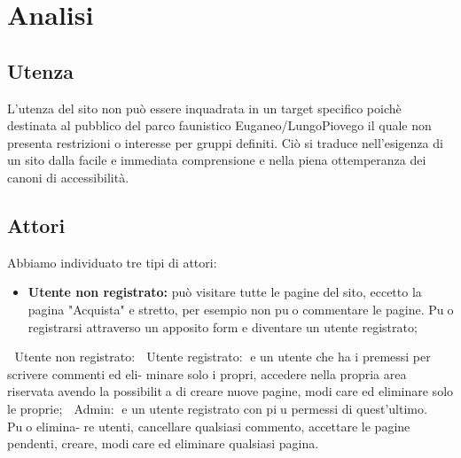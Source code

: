 \section{Analisi}

\subsection{Utenza}
L'utenza del sito non può essere inquadrata in un target specifico poichè
destinata al pubblico del parco faunistico Euganeo/LungoPiovego il quale
non presenta restrizioni o interesse per gruppi definiti.
Ciò si traduce nell'esigenza di un sito dalla facile e immediata
comprensione e nella piena ottemperanza dei canoni di accessibilità.

\subsection{Attori}
Abbiamo individuato tre tipi di attori:
\begin{itemize}
    \item \textbf{Utente non registrato: } può visitare tutte le pagine del sito, eccetto la pagina "Acquista" e stretto, per esempio non puo commentare le pagine. Puo registrarsi attraverso
    un apposito form e diventare un utente registrato;
\end{itemize}
 Utente non registrato: 
 Utente registrato: e un utente che ha i premessi per scrivere commenti ed eli-
minare solo i propri, accedere nella propria area riservata avendo la possibilita
di creare nuove pagine, modicare ed eliminare solo le proprie;
 Admin: e un utente registrato con piu permessi di quest'ultimo. Puo elimina-
re utenti, cancellare qualsiasi commento, accettare le pagine pendenti, creare,
modicare ed eliminare qualsiasi pagina.

